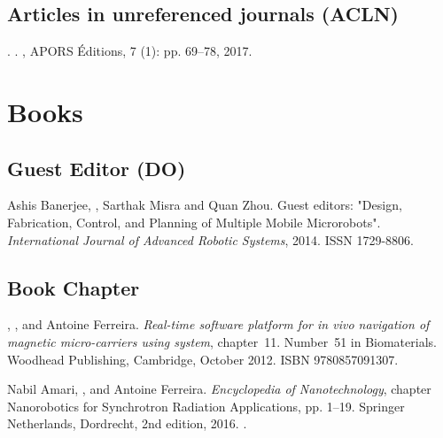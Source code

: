 \subsection[Articles  in unreferenced Journals]{Articles in unreferenced journals (ACLN)}
\begin{Mybibliography}{10}
  \DavidFolio.
  \newblock {}.
  \newblock {}, APORS Éditions, 7 (1): pp. 69--78, 2017.
  \newblock {}
  
\end{Mybibliography}

\section{Books}
\subsection{Guest Editor (DO)}
\begin{Mybibliography}{10}
 Ashis Banerjee, \DavidFolio, Sarthak Misra  and Quan Zhou.
  \newblock Guest editors: "{Design, Fabrication, Control, and Planning of Multiple Mobile Microrobots}".
  \newblock \emph{International Journal of Advanced Robotic Systems}, 2014.
  \newblock  ISSN 1729-8806.
  \newblock {}
\end{Mybibliography}

\subsection{Book Chapter}
\begin{Mybibliography}{10}
  \KBelharet, \DavidFolio, and Antoine Ferreira.
  \newblock \emph{Real-time software platform for in vivo navigation of magnetic
    micro-carriers using {\MRIshort} system}, chapter~11.
  \newblock Number~51 in Biomaterials. Woodhead Publishing, Cambridge, October
  2012.
  \newblock ISBN 9780857091307.
  
  Nabil Amari, \DavidFolio, and Antoine Ferreira.
  \newblock \emph{Encyclopedia of Nanotechnology}, chapter Nanorobotics for
  Synchrotron Radiation Applications, pp. 1--19.
  \newblock Springer Netherlands, Dordrecht, 2nd edition, 2016.
  \newblock {}.
\end{Mybibliography}


